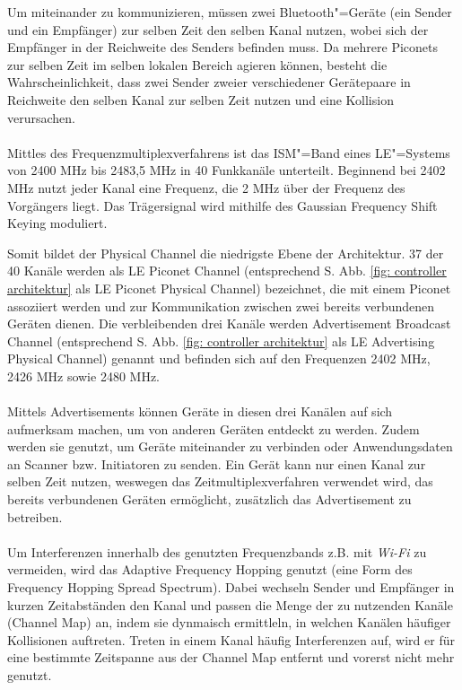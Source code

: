 Um miteinander zu kommunizieren, müssen zwei Bluetooth"=Geräte (ein Sender und ein Empfänger) zur selben Zeit den selben Kanal nutzen, wobei sich der Empfänger in der Reichweite des Senders befinden muss. Da mehrere Piconets zur selben Zeit im selben lokalen Bereich agieren können, besteht die Wahrscheinlichkeit, dass zwei Sender zweier verschiedener Gerätepaare in Reichweite den selben Kanal zur selben Zeit nutzen und eine Kollision verursachen.
\\\\
Mittles des Frequenzmultiplexverfahrens ist das ISM"=Band eines LE"=Systems von 2400 MHz bis 2483,5 MHz in 40 Funkkanäle unterteilt. Beginnend bei 2402 MHz nutzt jeder Kanal eine Frequenz, die 2 MHz über der Frequenz des Vorgängers liegt. Das Trägersignal wird mithilfe des Gaussian Frequency Shift Keying moduliert. \cite{BtSpec4.0_2180-2181}

Somit bildet der Physical Channel die niedrigste Ebene der Architektur. 37 der 40 Kanäle werden als LE Piconet Channel (entsprechend S. \pageref{fig: controller architektur} Abb. \ref{fig: controller architektur} als LE Piconet Physical Channel) bezeichnet, die mit einem Piconet assoziiert werden und zur Kommunikation zwischen zwei bereits verbundenen Geräten dienen. Die verbleibenden drei Kanäle werden Advertisement Broadcast Channel (entsprechend S. \pageref{fig: controller architektur} Abb. \ref{fig: controller architektur} als LE Advertising Physical Channel) genannt und befinden sich auf den Frequenzen 2402 MHz, 2426 MHz sowie 2480 MHz. \cite{BtSpec4.0_2199}
\\\\
Mittels Advertisements können Geräte in diesen drei Kanälen auf sich aufmerksam machen, um von anderen Geräten entdeckt zu werden. Zudem werden sie genutzt, um Geräte miteinander zu verbinden oder Anwendungsdaten an Scanner bzw. Initiatoren zu senden. Ein Gerät kann nur einen Kanal zur selben Zeit nutzen, weswegen das Zeitmultiplexverfahren verwendet wird, das bereits verbundenen Geräten ermöglicht, zusätzlich das Advertisement zu betreiben.
\\\\
Um Interferenzen innerhalb des genutzten Frequenzbands z.B. mit \textit{Wi-Fi} zu vermeiden, wird das Adaptive Frequency Hopping \cite{BtAfh} genutzt (eine Form des Frequency Hopping Spread Spectrum). Dabei wechseln Sender und Empfänger in kurzen Zeitabständen den Kanal und passen die Menge der zu nutzenden Kanäle (Channel Map) an, indem sie dynmaisch ermittleln, in welchen Kanälen häufiger Kollisionen auftreten. Treten in einem Kanal häufig Interferenzen auf, wird er für eine bestimmte Zeitspanne aus der Channel Map entfernt und vorerst nicht mehr genutzt.
